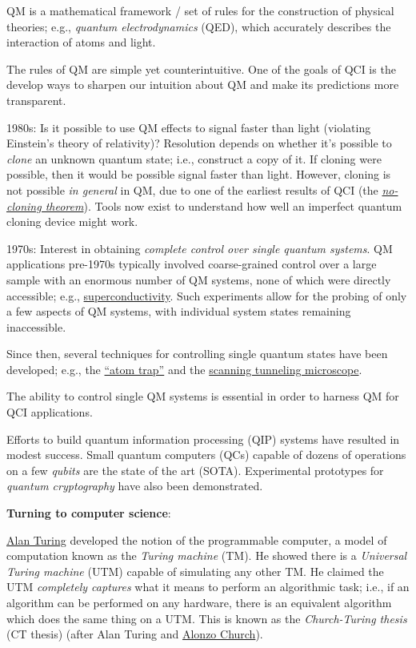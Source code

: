\documentclass{article}
\numberwithin{equation}{section}
\begin{document}
QM is a mathematical framework / set of rules for the construction of physical theories; e.g., \textit{quantum electrodynamics} (QED), which accurately describes the interaction of atoms and light.

The rules of QM are simple yet counterintuitive. One of the goals of QCI is the develop ways to sharpen our intuition about QM and make its predictions more transparent.

1980s: Is it possible to use QM effects to signal faster than light (violating Einstein's theory of relativity)? Resolution depends on whether it's possible to \textit{clone} an unknown quantum state; i.e., construct a copy of it. If cloning were possible, then it would be possible signal faster than light. However, cloning is not possible \textit{in general} in QM, due to one of the earliest results of QCI (the \href{https://en.wikipedia.org/wiki/No-cloning_theorem}{\textit{no-cloning theorem}}). Tools now exist to understand how well an imperfect quantum cloning device might work.

1970s: Interest in obtaining \textit{complete control over single quantum systems}. QM applications pre-1970s typically involved coarse-grained control over a large sample with an enormous number of QM systems, none of which were directly accessible; e.g., \href{https://en.wikipedia.org/wiki/Superconductivity}{superconductivity}. Such experiments allow for the probing of only a few aspects of QM systems, with individual system states remaining inaccessible.

Since then, several techniques for controlling single quantum states have been developed; e.g., the \href{https://en.wikipedia.org/wiki/Magnetic_trap_(atoms)}{``atom trap''} and the \href{https://en.wikipedia.org/wiki/Scanning_tunneling_microscope}{scanning tunneling microscope}.

The ability to control single QM systems is essential in order to harness QM for QCI applications.

Efforts to build quantum information processing (QIP) systems have resulted in modest success. Small quantum computers (QCs) capable of dozens of operations on a few \textit{qubits} are the state of the art (SOTA). Experimental prototypes for \textit{quantum cryptography} have also been demonstrated.

\textbf{Turning to computer science}:

\href{https://en.wikipedia.org/wiki/Alan_Turing}{Alan Turing} developed the notion of the programmable computer, a model of computation known as the \textit{Turing machine} (TM). He showed there is a \textit{Universal Turing machine} (UTM) capable of simulating any other TM. He claimed the UTM \textit{completely captures} what it means to perform an algorithmic task; i.e., if an algorithm can be performed on any hardware, there is an equivalent algorithm which does the same thing on a UTM. This is known as the \textit{Church-Turing thesis} (CT thesis) (after Alan Turing and \href{https://en.wikipedia.org/wiki/Alonzo_Church}{Alonzo Church}).
\end{document}
